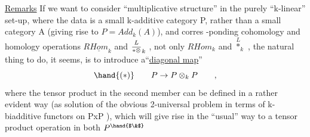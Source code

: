 \uline{Remarks}  If we want to consider ``multiplicative structure'' in the purely
``k-linear'' set-up, where the data is a small k-additive category P,
rather than a small category A (giving rise to $P = Add_k(A)$), and corres
-ponding cohomology  and homology operations $R\underline{Hom}_k$ and $\overset{L}{\over{\ast}{\otimes}}_k$ ,
not only $RHom_k$ and $\overset{L}{\ast}_k$ , the natural thing to do, it seems, is to
introduce a\hand{/}``\uline{diagonal map}''
\[ \hand{(*)} \qquad P \to P\otimes_k P \qquad , \]
where the tensor product in the second member  can be defined in a
rather evident way (as solution of the obvious 2-universal problem in
terms of k-biadditive functors on PxP ), which will give rise in the
``usual'' way to a tensor product operation in both $P^{\hand{$\&$}}$ 

